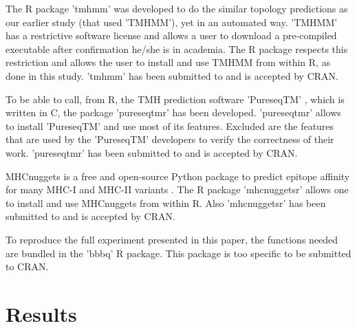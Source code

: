 
The R package 'tmhmm' was developed to do the similar topology
predictions as our earlier study (that used 'TMHMM'), yet in an automated way.
'TMHMM' has a restrictive software license  and allows a user
to download a pre-compiled executable after confirmation he/she
is in academia. The R package respects this restriction
and allows the user to install and use TMHMM from within R,
as done in this study.
'tmhmm' has been submitted to and is accepted by CRAN.


To be able to call, from R, the TMH prediction software 'PureseqTM' ,
which is written in C, the package 'pureseqtmr' has been developed. 
'pureseqtmr' allows to install 'PureseqTM' and use most of its features.
Excluded are the features that are used by the 'PureseqTM' 
developers to verify the correctness of their work.
'pureseqtmr' has been submitted to and is accepted by CRAN.


MHCnuggets is a free and open-source Python package to predict 
epitope affinity for many MHC-I and MHC-II variants .
The R package 'mhcnuggetsr' allows one to install and use MHCnuggets
from within R.
Also 'mhcnuggetsr' has been submitted to and is accepted by CRAN.


To reproduce the full experiment presented in this paper,
the functions needed are bundled in the 'bbbq' R package.
This package is too specific to be submitted to CRAN.

\section{Results}


